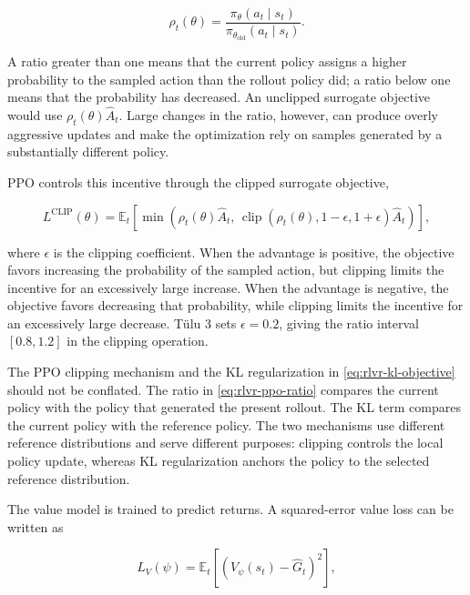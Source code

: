 \begin{equation}
    \rho_t(\theta)
    =
    \frac{
        \pi_\theta(a_t\mid s_t)
    }{
        \pi_{\theta_{\mathrm{old}}}(a_t\mid s_t)
    }.
    \label{eq:rlvr-ppo-ratio}
\end{equation}

A ratio greater than one means that the current policy assigns a higher
probability to the sampled action than the rollout policy did; a ratio below
one means that the probability has decreased. An unclipped surrogate
objective would use \(\rho_t(\theta)\widehat{A}_t\). Large changes in the
ratio, however, can produce overly aggressive updates and make the
optimization rely on samples generated by a substantially different policy.

PPO controls this incentive through the clipped surrogate objective,

\begin{equation}
    \boxed{
    L^{\mathrm{CLIP}}(\theta)
    =
    \mathbb{E}_t
    \left[
        \min
        \left(
            \rho_t(\theta)\widehat{A}_t,\,
            \operatorname{clip}
            \left(
                \rho_t(\theta),1-\epsilon,1+\epsilon
            \right)\widehat{A}_t
        \right)
    \right],
    }
    \label{eq:rlvr-ppo-clip}
\end{equation}

where \(\epsilon\) is the clipping coefficient. When the advantage is
positive, the objective favors increasing the probability of the sampled
action, but clipping limits the incentive for an excessively large increase.
When the advantage is negative, the objective favors decreasing that
probability, while clipping limits the incentive for an excessively large
decrease. Tülu 3 sets \(\epsilon=0.2\), giving the ratio interval
\([0.8,1.2]\) in the clipping operation.

The PPO clipping mechanism and the KL regularization in
\cref{eq:rlvr-kl-objective} should not be conflated. The ratio in
\cref{eq:rlvr-ppo-ratio} compares the current policy with the policy that
generated the present rollout. The KL term compares the current policy with
the reference policy. The two mechanisms use different reference
distributions and serve different purposes: clipping controls the local
policy update, whereas KL regularization anchors the policy to the selected
reference distribution.

The value model is trained to predict returns. A squared-error value loss
can be written as

\begin{equation}
    L_V(\psi)
    =
    \mathbb{E}_t
    \left[
        \left(
            V_\psi(s_t)-\widehat{G}_t
        \right)^2
    \right],
    \label{eq:rlvr-value-loss}
\end{equation}

